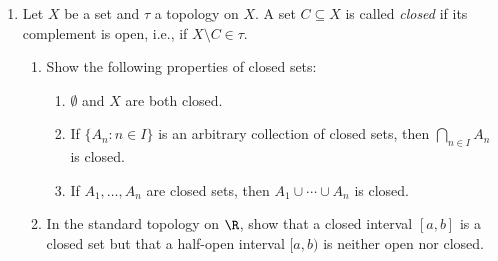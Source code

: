 \begin{enumerate}
\item Let $X$ be a set and $\tau$ a topology on $X$. A set $C \subseteq X$ is called \emph{closed} if its complement is open, i.e., if $X \setminus C \in \tau$. 
\begin{enumerate}
    \item Show the following properties of closed sets:
    \begin{enumerate}[label=(\roman*)]
        \item $\emptyset$ and $X$ are both closed.
        \item If $\{A_n : n \in I\}$ is an arbitrary collection of closed sets, then $\bigcap_{n \in I} A_n$ is closed.
        \item If $A_1,\ldots,A_n$ are closed sets, then $A_1 \cup \cdots \cup A_n$ is closed.
    \end{enumerate}
    \item In the standard topology on $\R$, show that a closed interval $[a,b]$ is a closed set but that a half-open interval $[a,b)$ is neither open nor closed.
\end{enumerate}
\end{enumerate}